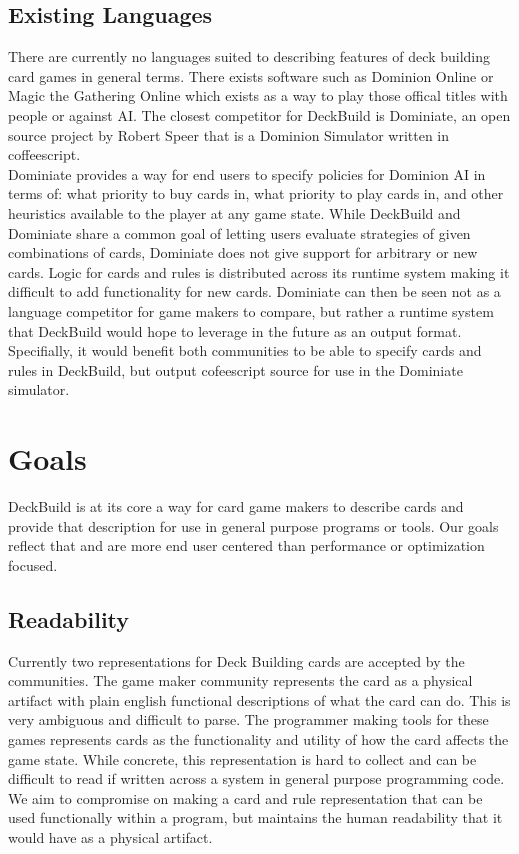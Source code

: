 \subsection{Existing Languages}
There are currently no languages suited to describing features of deck building card games in general
terms. There exists software such as Dominion Online or Magic the Gathering Online which exists as
a way to play those offical titles with people or against AI.
The closest competitor for DeckBuild is Dominiate, an
open source project by Robert Speer that is a Dominion Simulator written in coffeescript.
\\
Dominiate provides a way for end users to specify policies for Dominion AI in terms of:
what priority to buy cards in, what priority to play cards in, and other heuristics available
to the player at any game state. While DeckBuild and Dominiate share a common goal of letting users evaluate
strategies of given combinations of cards, Dominiate does not give support for arbitrary or new cards.
Logic for cards and rules is distributed across its runtime system making it
difficult to add functionality for new cards. Dominiate can then be seen not as a language competitor
 for game makers to compare, but rather a runtime system that DeckBuild would hope to leverage in the
 future as an output format. Specifially, it would benefit both communities to be able to specify
 cards and rules in DeckBuild, but output cofeescript source for use in the Dominiate simulator.
\section{Goals} \label{sec:goals}
DeckBuild is at its core a way for card game makers to describe cards and provide that description
for use in general purpose programs or tools. Our goals reflect that and are more end user centered than
performance or optimization focused.
\subsection{Readability}
Currently two representations for Deck Building cards are accepted by the communities. The game maker
community represents the card as a physical artifact with plain english functional descriptions
of what the card can do. This is very ambiguous and difficult to parse. The
programmer making tools for these games represents cards as the functionality and utility of how the
card affects the game state. While concrete, this representation is hard to collect and can be difficult to read
if written across a system in general purpose programming code. We aim to compromise
on making a card and rule representation that can be used functionally within a program, but maintains
the human readability that it would have as a physical artifact.
